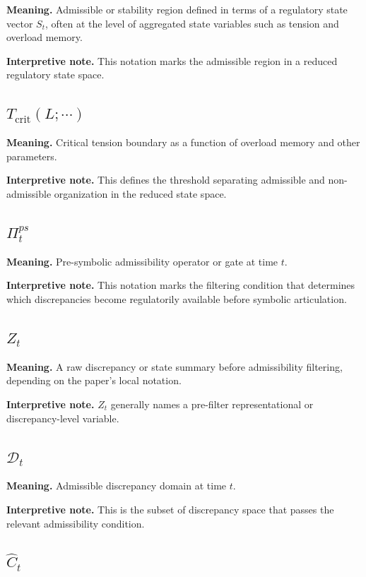 \documentclass[11pt,a4paper]{article}
\begin{document}
	\textbf{Meaning.} Admissible or stability region defined in terms of a regulatory state vector $S_t$, often at the level of aggregated state variables such as tension and overload memory.
	
	\textbf{Interpretive note.} This notation marks the admissible region in a reduced regulatory state space.
	
	\subsection{$T_{\mathrm{crit}}(L;\cdots)$}
	
	\textbf{Meaning.} Critical tension boundary as a function of overload memory and other parameters.
	
	\textbf{Interpretive note.} This defines the threshold separating admissible and non-admissible organization in the reduced state space.
	
	\subsection{$\Pi_t^{ps}$}
	
	\textbf{Meaning.} Pre-symbolic admissibility operator or gate at time $t$.
	
	\textbf{Interpretive note.} This notation marks the filtering condition that determines which discrepancies become regulatorily available before symbolic articulation.
	
	\subsection{$Z_t$}
	
	\textbf{Meaning.} A raw discrepancy or state summary before admissibility filtering, depending on the paper's local notation.
	
	\textbf{Interpretive note.} $Z_t$ generally names a pre-filter representational or discrepancy-level variable.
	
	\subsection{$\mathcal{D}_t$}
	
	\textbf{Meaning.} Admissible discrepancy domain at time $t$.
	
	\textbf{Interpretive note.} This is the subset of discrepancy space that passes the relevant admissibility condition.
	
	\subsection{$\widehat{C}_t$}
	
\end{document}
